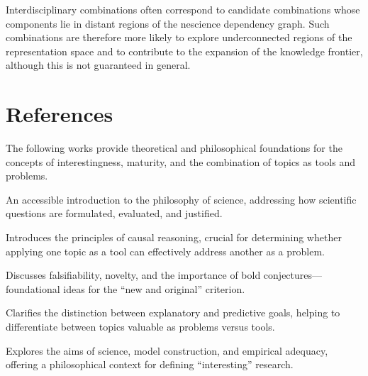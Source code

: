 \noindent
Interdisciplinary combinations often correspond to candidate combinations whose components lie in distant regions of the nescience dependency graph. Such combinations are therefore more likely to explore underconnected regions of the representation space and to contribute to the expansion of the knowledge frontier, although this is not guaranteed in general.

%
%

\section*{References}

The following works provide theoretical and philosophical foundations for the concepts of interestingness, maturity, and the combination of topics as tools and problems.

\cite{chalmers2013thing} An accessible introduction to the philosophy of science, addressing how scientific questions are formulated, evaluated, and justified.

\cite{pearl2019book} Introduces the principles of causal reasoning, crucial for determining whether applying one topic as a tool can effectively address another as a problem.

\cite{popper2014conjectures} Discusses falsifiability, novelty, and the importance of bold conjectures—foundational ideas for the “new and original” criterion.

\cite{shmueli2010explain} Clarifies the distinction between explanatory and predictive goals, helping to differentiate between topics valuable as problems versus tools.

\cite{van1980scientific} Explores the aims of science, model construction, and empirical adequacy, offering a philosophical context for defining “interesting” research.
